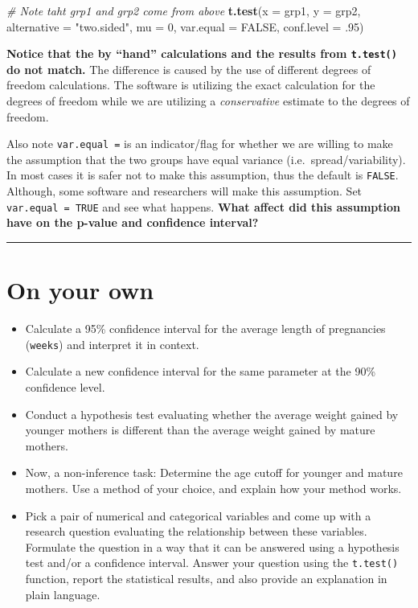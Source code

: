 \documentclass[]{book}
\newenvironment{Shaded}{\begin{snugshade}}{\end{snugshade}}
\newcommand{\KeywordTok}[1]{\textcolor[rgb]{0.13,0.29,0.53}{\textbf{{#1}}}}
\newcommand{\DataTypeTok}[1]{\textcolor[rgb]{0.13,0.29,0.53}{{#1}}}
\newcommand{\DecValTok}[1]{\textcolor[rgb]{0.00,0.00,0.81}{{#1}}}
\newcommand{\StringTok}[1]{\textcolor[rgb]{0.31,0.60,0.02}{{#1}}}
\newcommand{\CommentTok}[1]{\textcolor[rgb]{0.56,0.35,0.01}{\textit{{#1}}}}
\newcommand{\OtherTok}[1]{\textcolor[rgb]{0.56,0.35,0.01}{{#1}}}
\newcommand{\NormalTok}[1]{{#1}}
\theoremstyle{definition}
\theoremstyle{definition}
\theoremstyle{definition}
\theoremstyle{remark}
\begin{document}
\begin{Shaded}
\begin{Highlighting}[]
\CommentTok{# Note taht grp1 and grp2 come from above}
\KeywordTok{t.test}\NormalTok{(}\DataTypeTok{x =} \NormalTok{grp1, }\DataTypeTok{y =} \NormalTok{grp2, }\DataTypeTok{alternative =} \StringTok{"two.sided"}\NormalTok{, }\DataTypeTok{mu =} \DecValTok{0}\NormalTok{, }\DataTypeTok{var.equal =} \OtherTok{FALSE}\NormalTok{, }\DataTypeTok{conf.level =} \NormalTok{.}\DecValTok{95}\NormalTok{)}
\end{Highlighting}
\end{Shaded}

\textbf{Notice that the by ``hand'' calculations and the results from
\texttt{t.test()} do not match.} The difference is caused by the use of
different degrees of freedom calculations. The software is utilizing the
exact calculation for the degrees of freedom while we are utilizing a
\emph{conservative} estimate to the degrees of freedom.

Also note \texttt{var.equal\ =} is an indicator/flag for whether we are
willing to make the assumption that the two groups have equal variance
(i.e.~spread/variability). In most cases it is safer not to make this
assumption, thus the default is \texttt{FALSE}. Although, some software
and researchers will make this assumption. Set
\texttt{var.equal\ =\ TRUE} and see what happens. \textbf{What affect
did this assumption have on the p-value and confidence interval?}

\begin{center}\rule{0.5\linewidth}{\linethickness}\end{center}

\section{On your own}\label{on-your-own-5}

\begin{itemize}
\item
  Calculate a 95\% confidence interval for the average length of
  pregnancies (\texttt{weeks}) and interpret it in context.
\item
  Calculate a new confidence interval for the same parameter at the 90\%
  confidence level.
\item
  Conduct a hypothesis test evaluating whether the average weight gained
  by younger mothers is different than the average weight gained by
  mature mothers.
\item
  Now, a non-inference task: Determine the age cutoff for younger and
  mature mothers. Use a method of your choice, and explain how your
  method works.
\item
  Pick a pair of numerical and categorical variables and come up with a
  research question evaluating the relationship between these variables.
  Formulate the question in a way that it can be answered using a
  hypothesis test and/or a confidence interval. Answer your question
  using the \texttt{t.test()} function, report the statistical results,
  and also provide an explanation in plain language.
\end{itemize}
\end{document}
